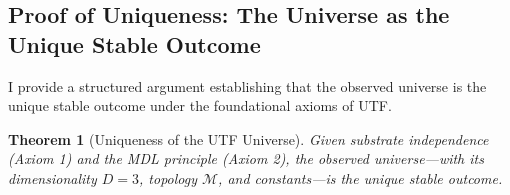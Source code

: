 \documentclass[11pt, a4paper]{article}
\newtheorem{theorem}{Theorem}[section]
\theoremstyle{definition}
\theoremstyle{definition}
\newcommand{\M}{\mathcal{M}}
\begin{document}
\subsection{Proof of Uniqueness: The Universe as the Unique Stable Outcome}

I provide a structured argument establishing that the observed universe is the unique stable outcome under the foundational axioms of UTF.

\begin{theorem}[Uniqueness of the UTF Universe]\label{thm:uniqueness}
Given substrate independence (Axiom 1) and the MDL principle (Axiom 2), the observed universe—with its dimensionality $D=3$, topology $\M$, and constants—is the unique stable outcome.
\end{theorem}
\end{document}
